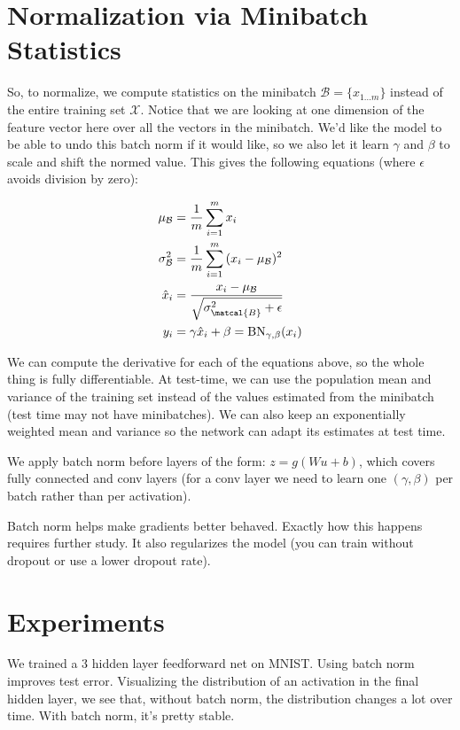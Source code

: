 \documentclass[a4paper]{article}
\begin{document}
\section{Normalization via Minibatch Statistics}
So, to normalize, we compute statistics on the minibatch
$\mathcal{B} = \{x_{1...m}\}$ instead of the entire training set
$\mathcal{X}$. Notice that we are looking at one dimension of the feature vector
here over all the vectors in the minibatch.
We'd like the model to be able to undo this batch norm if it
would like, so we also let it learn $\gamma$ and $\beta$ to scale and shift the
normed value. This gives the following equations (where $\epsilon$ avoids
division by zero):

\begin{align}
  \mu_\mathcal{B} &= \frac{1}{m} \sum_{i=1}^{m}{x_i} \\
  \sigma^2_\mathcal{B} &= \frac{1}{m}
    \sum_{i=1}^{m}{(x_i - \mu_\mathcal{B})^2} \\
  \hat{x}_i &= \frac{x_i - \mu_{\mathcal{B}}}{
  \sqrt{\sigma^2_{\matcal{B}} + \epsilon}} \\
  y_i &= \gamma \hat{x}_i + \beta
  = \text{BN}_{\gamma, \beta}(x_i)
\end{align}

We can compute the derivative for each of the equations above, so the whole
thing is fully differentiable. At test-time, we can use the population mean and
variance of the training set instead of the values estimated from the minibatch
(test time may not have minibatches). We can also keep an exponentially
weighted mean and variance so the network can adapt its estimates at test time.

We apply batch norm before layers of the form: $z = g(W u + b)$,
which covers fully connected and conv layers (for a conv layer we need to learn
one $(\gamma, \beta)$ per batch rather than per activation).

Batch norm helps make gradients better behaved. Exactly how this happens
requires further study. It also regularizes the model (you can train without
dropout or use a lower dropout rate).

\section{Experiments}
We trained a 3 hidden layer feedforward net on MNIST. Using batch norm
improves test error. Visualizing the distribution of an activation in the final
hidden layer, we see that, without batch norm, the distribution changes a lot
over time. With batch norm, it's pretty stable.
\end{document}
